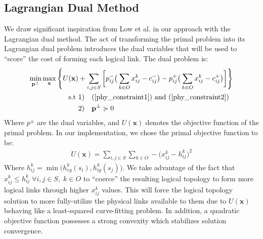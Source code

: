 \documentclass[sigconf]{acmart}
\theoremstyle{definition}
\begin{document}
\subsection{Lagrangian Dual Method}\label{section_lagrangian_dual}
We draw significant inspiration from Low et al. \cite{low1999optimization} in our approach with the Lagrangian dual method.
The act of transforming the primal problem into its Lagrangian dual problem introduces the dual variables that will be used to ``score'' the cost of forming each logical link. 
The dual problem is:
\begin{equation}
\begin{aligned}
\min\limits_{\mathbf{p}^\pm}\max\limits_{\mathbf{x}}\Bigg\{U(\mathbf{x}) & + \sum\limits_{i, j \in S} \bigg[p_{ij}^- \big( \sum\limits_{k \in O}x_{ij}^k - c_{ij}^-\big) -p_{ij}^+ \big( \sum\limits_{k \in O}x_{ij}^k - c_{ij}^+ \big) \bigg] \Bigg\} \\
\text{s.t } & 1) \quad (\ref{phy_constraint1}) \text{ and } (\ref{phy_constraint2})\\
\text{} & 2) \quad \mathbf{p^\pm}  \succcurlyeq 0
\end{aligned}
\label{eqn:langrangian_duality}
\end{equation}
Where $p^\pm$ are the dual variables, and $U(\mathbf{x})$ denotes the objective function of the primal problem. In our implementation, we chose the primal objective function to be:
\begin{equation} 
\begin{aligned}
U(\mathbf{x}) = \sum\limits_{i, j \in S} \sum\limits_{k \in O} -\big( x_{ij}^k - h_{ij}^k\big)^2
\end{aligned}
\label{eqn:lagrangian_primal_objective}
\end{equation}
Where $h_{ij}^k = \min\big(h_{eg}^k(s_i), h_{ig}^k(s_j)\big)$. We take advantage of the fact that $x_{ij}^k \leq h_{ij}^k \; \forall i, j \in S, \; k \in O$ to ``coerce'' the resulting logical topology to form more logical links through higher $x_{ij}^k$ values. This will force the logical topology solution to more fully-utilize the physical links available to them due to $U(\mathbf{x})$ behaving like a least-squared curve-fitting problem. In addition, a quadratic objective function possesses a strong convexity which stabilizes solution convergence. 
\end{document}
